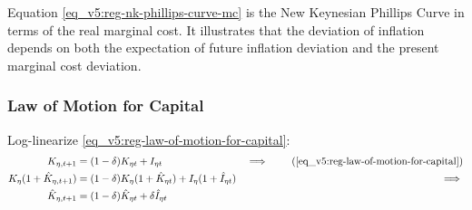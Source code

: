 \documentclass[../thesis.tex]{subfiles}
\begin{document}
Equation \ref{eq_v5:reg-nk-phillips-curve-mc} is the New Keynesian Phillips Curve in terms of the real marginal cost. It illustrates that the deviation of inflation depends on both the expectation of future inflation deviation and the present marginal cost deviation.


\subsubsection*{Law of Motion for Capital}

Log-linearize \ref{eq_v5:reg-law-of-motion-for-capital}:
	\begin{alignat}{2}
		K_{\eta, t+1} &= (1-\delta)K_{\eta t} + I_{\eta t} &\implies \tag{\ref{eq_v5:reg-law-of-motion-for-capital}} \\
		K_{\eta} (1 + \hat{K}_{\eta, t+1}) &= (1-\delta) K_{\eta} (1 + \hat{K}_{\eta t}) + I_{\eta} (1 + \hat{I}_{\eta t}) &\implies \nonumber \\
		\hat{K}_{\eta, t+1} &= (1-\delta) \hat{K}_{\eta t} + \delta \hat{I}_{\eta t} \label{eq_v5:reg-ll-law-of-motion-for-capital}
	\end{alignat}

\end{document}
